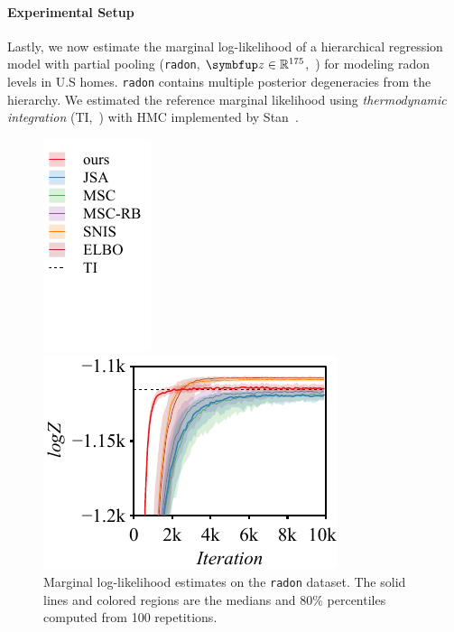 \paragraph{Experimental Setup}
Lastly, we now estimate the marginal log-likelihood of a hierarchical regression model with partial pooling (\texttt{radon}, \(\vz \in \mathbb{R}^{175}\),~\citealt{gelman_data_2007}) for modeling radon levels in U.S homes.
\texttt{radon} contains multiple posterior degeneracies from the hierarchy.
We estimated the reference marginal likelihood using \textit{thermodynamic integration} (TI,~\citealt{gelman_simulating_1998, neal_annealed_2001, lartillot_computing_2006}) with HMC implemented by Stan~\citep{carpenter_stan_2017, betancourt_conceptual_2017}.
%
\begin{figure}
  \vspace{-0.25in}
  \centering
  \begin{minipage}[b]{0.25\linewidth}
    \centering
    \includegraphics[scale=0.8]{figures/radon_03.pdf}
  \end{minipage}
  \begin{minipage}[b]{0.7\linewidth}
    \centering
    \includegraphics[scale=0.8]{figures/radon_02.pdf}
  \end{minipage}
    \vspace{-0.1in}
  \caption{Marginal log-likelihood estimates on the \texttt{radon} dataset.
    The solid lines and colored regions are the medians and 80\% percentiles computed from 100 repetitions.
  }\label{fig:marginal_likelihood}
  \vspace{-0.2in}
\end{figure}
%
  \vspace{-0.2in}
